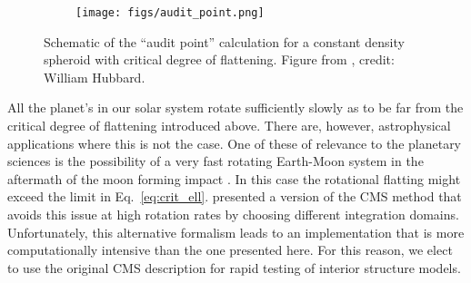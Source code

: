 \begin{figure}[h!]  
  \centering
    \texttt{[image: figs/audit\_point.png]}
\caption{ Schematic of the ``audit point'' calculation for a constant density
    spheroid with critical degree of flattening. Figure from \citet{Hubbard2014},
credit: William Hubbard.}
\label{fig:audit_point}
\end{figure}

All the planet's in our solar system rotate sufficiently slowly as to be far from the
critical degree of flattening introduced above. There are, however, astrophysical
applications where this is not the case. One of these of relevance to the planetary
sciences is the possibility of a very fast rotating Earth-Moon system in the
aftermath of the moon forming impact \cite{Cuk2012}. In this case the rotational
flatting might exceed the limit in Eq.~\ref{eq:crit_ell}. \citet{Kong2013} presented
a version of the CMS method that avoids this issue at high rotation rates by choosing
different integration domains. Unfortunately, this alternative formalism leads to an
implementation that is more computationally intensive than the one presented here.
For this reason, we elect to use the original CMS description for rapid testing of
interior structure models.

